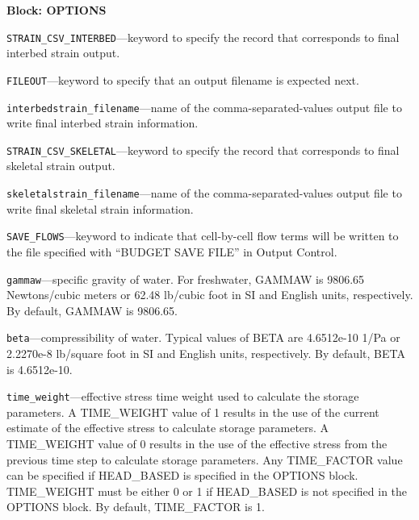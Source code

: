 
\item \textbf{Block: OPTIONS}

\begin{description}
\item \texttt{STRAIN\_CSV\_INTERBED}---keyword to specify the record that corresponds to final interbed strain output.

\item \texttt{FILEOUT}---keyword to specify that an output filename is expected next.

\item \texttt{interbedstrain\_filename}---name of the comma-separated-values output file to write final interbed strain information.

\item \texttt{STRAIN\_CSV\_SKELETAL}---keyword to specify the record that corresponds to final skeletal strain output.

\item \texttt{skeletalstrain\_filename}---name of the comma-separated-values output file to write final skeletal strain information.

\item \texttt{SAVE\_FLOWS}---keyword to indicate that cell-by-cell flow terms will be written to the file specified with ``BUDGET SAVE FILE'' in Output Control.

\item \texttt{gammaw}---specific gravity of water. For freshwater, GAMMAW is 9806.65 Newtons/cubic meters or 62.48 lb/cubic foot in SI and English units, respectively. By default, GAMMAW is 9806.65.

\item \texttt{beta}---compressibility of water. Typical values of BETA are 4.6512e-10 1/Pa or 2.2270e-8 lb/square foot in SI and English units, respectively. By default, BETA is 4.6512e-10.

\item \texttt{time\_weight}---effective stress time weight used to calculate the storage parameters. A TIME\_WEIGHT value of 1 results in the use of the current estimate of the effective stress to calculate storage parameters. A TIME\_WEIGHT value of 0 results in the use of the effective stress from the previous time step to calculate storage parameters. Any TIME\_FACTOR value can be specified if HEAD\_BASED is specified in the OPTIONS block.  TIME\_WEIGHT must be either 0 or 1 if HEAD\_BASED is not specified in the OPTIONS block. By default, TIME\_FACTOR is 1.


\end{description}

